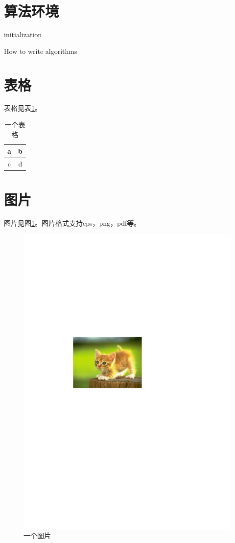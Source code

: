 \documentclass[format=draft,degree=bachelor]{hustthesis}
\begin{document}
\section{算法环境}

\begin{algorithm}[H]
\SetAlgoLined
{}
initialization\;
\caption{How to write algorithms}
\end{algorithm}

\section{表格}
表格见表\ref{tab:1}。

\begin{table}[ht]
\centering
\caption{一个表格}\label{tab:1}
\begin{tabular}{|c|c|}
\hline
a & b \\
\hline
c & d \\
\hline
\end{tabular}
\end{table}

\section{图片}
图片见图\ref{fig:1}。图片格式支持eps，png，pdf等。

\begin{figure}[hb]
\centering
\includegraphics[width=.8\textwidth]{fig-example.pdf}
\caption{一个图片}\label{fig:1}
\end{figure}
\end{document}
